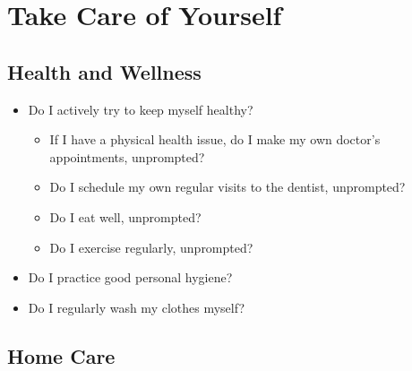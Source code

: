 \part{Take Care of Yourself}
\label{takecareofyourself}

\chapter{Health and Wellness}
\label{healthandwellness}

\begin{itemize}
\item Do I actively try to keep myself healthy?

\begin{itemize}
\item If I have a physical health issue, do I make my own doctor's appointments, unprompted?

\item Do I schedule my own regular visits to the dentist, unprompted?

\item Do I eat well, unprompted?

\item Do I exercise regularly, unprompted?

\end{itemize}

\item Do I practice good personal hygiene?

\item Do I regularly wash my clothes myself?

\end{itemize}

\chapter{Home Care}
\label{homecare}

